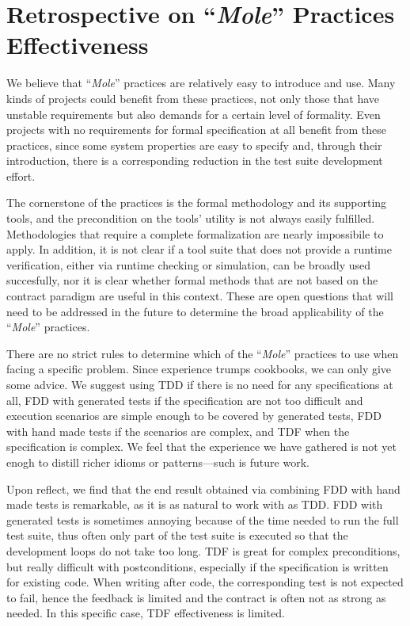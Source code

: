 \documentclass[english]{lni}
\newcommand{\mole}{``\emph{Mole}''\xspace}
\begin{document}
\section{Retrospective on \mole Practices Effectiveness}
\label{subsec:test_cases_retrospectives}

We believe that \mole practices are relatively easy to introduce and use.
Many kinds of projects could benefit from these practices, not only those that have unstable requirements but also demands for a certain level of formality.
Even projects with no requirements for formal specification at all benefit from these practices, since some system properties are easy to specify and, through their introduction, there is a corresponding reduction in the test suite development effort.

The cornerstone of the practices is the formal methodology and its supporting tools, and the precondition on the tools' utility is not always easily fulfilled.
Methodologies that require a complete formalization are nearly impossibile to apply.
In addition, it is not clear if a tool suite that does not provide a runtime verification, either via runtime checking or simulation, can be broadly used succesfully, nor it is clear whether formal methods that are not based on the contract paradigm are useful in this context.
These are open questions that will need to be addressed in the future to determine the broad applicability of the \mole practices.

There are no strict rules to determine which of the \mole practices to use when facing a specific problem.
Since experience trumps cookbooks, we can only give some advice.
We suggest using TDD if there is no need for any specifications at all, FDD with generated tests if the specification are not too difficult and execution scenarios are simple enough to be covered by generated tests, FDD with hand made tests if the scenarios are complex, and TDF when the specification is complex.
We feel that the experience we have gathered is not yet enogh to distill richer idioms or patterns---such is future work.

Upon reflect, we find that the end result obtained via combining FDD with hand made tests is remarkable, as it is as natural to work with as TDD. 
FDD with generated tests is sometimes annoying because of the time needed to run the full test suite, thus often only part of the test suite is executed so that the development loops do not take too long.
TDF is great for complex preconditions, but really difficult with postconditions, especially if the specification is written for existing code. 
When writing after code, the corresponding test is not expected to fail, hence the feedback is limited and the contract is often not as strong as needed. 
In this specific case, TDF effectiveness is limited.
\end{document}
